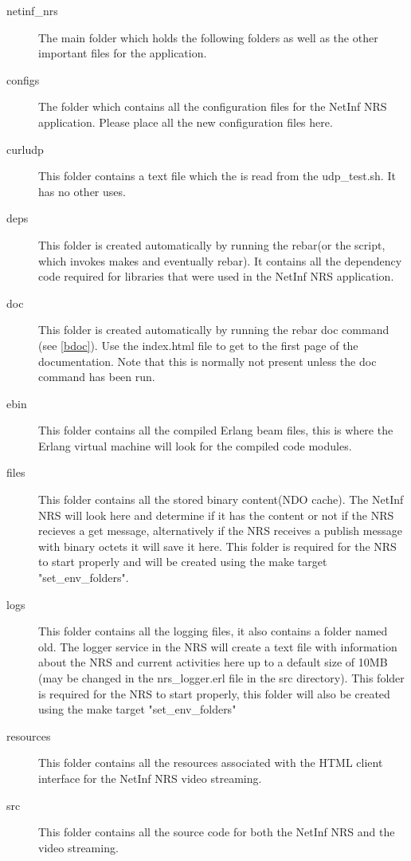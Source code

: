\begin{description}
\item [netinf\_nrs]
The main folder which holds the following folders as well as the other important files for the application.
\item [configs]
The folder which contains all the configuration files for the NetInf NRS application. Please place all the new configuration files here. 
\item [curludp]
This folder contains a text file which the is read from the udp\_test.sh. It has no other uses.
\item [deps]
This folder is created automatically by running the rebar(or the script, which invokes makes and eventually rebar). 
It contains all the dependency code required for libraries that were used in the NetInf NRS application. 
\item [doc]
This folder is created automatically by running the rebar doc command (see \ref{bdoc}). Use the index.html file to get to 
the first page of the documentation. Note that this is normally not present unless the doc command has been run.
\item [ebin]
This folder contains all the compiled Erlang beam files, this is where the Erlang virtual machine will look for the compiled code modules.
\item [files]
This folder contains all the stored binary content(NDO cache). The NetInf NRS will look here and determine if it has the content 
or not if the NRS recieves a get message, alternatively if the NRS receives a publish message with binary octets it will save it here. 
This folder is required for the NRS to start properly and will be created using the make target "set\_env\_folders".
\item [logs]
This folder contains all the logging files, it also contains a folder named old. The logger service in the NRS will create a text file 
with information about the NRS and current activities here up to a default size of 10MB (may be changed in the nrs\_logger.erl file 
in the src directory). This folder is required for the NRS to start properly, this folder will also be created using the make target "set\_env\_folders"
\item [resources]
This folder contains all the resources associated with the HTML client interface for the NetInf NRS video streaming.
\item [src]
This folder contains all the source code for both the NetInf NRS and the video streaming.
\end{description}

